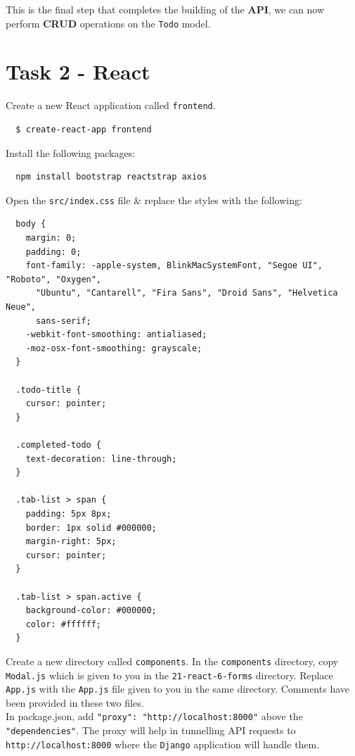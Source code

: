 \documentclass{article}
\begin{document}
This is the final step that completes the building of the \textbf{API}, we can now perform \textbf{CRUD} operations on the \texttt{Todo} model. 

\section*{Task 2 - React} 

Create a new React application called \texttt{frontend}.

\begin{verbatim}
  $ create-react-app frontend
\end{verbatim}

Install the following packages:

\begin{verbatim}
  npm install bootstrap reactstrap axios
\end{verbatim}

Open the \texttt{src/index.css} file \& replace the styles with the following:

\begin{verbatim}
  body {
    margin: 0;
    padding: 0;
    font-family: -apple-system, BlinkMacSystemFont, "Segoe UI", "Roboto", "Oxygen",
      "Ubuntu", "Cantarell", "Fira Sans", "Droid Sans", "Helvetica Neue",
      sans-serif;
    -webkit-font-smoothing: antialiased;
    -moz-osx-font-smoothing: grayscale;
  }

  .todo-title {
    cursor: pointer;
  }

  .completed-todo {
    text-decoration: line-through;
  }

  .tab-list > span {
    padding: 5px 8px;
    border: 1px solid #000000;
    margin-right: 5px;
    cursor: pointer;
  }

  .tab-list > span.active {
    background-color: #000000;
    color: #ffffff;
  }
\end{verbatim}

Create a new directory called \texttt{components}. In the \texttt{components} directory, copy \texttt{Modal.js} which is given to you in the \texttt{21-react-6-forms} directory. Replace \texttt{App.js} with the \texttt{App.js} file given to you in the same directory. Comments have been provided in these two files. \\

In package.json, add \texttt{"proxy": "http://localhost:8000"} above the \texttt{"dependencies"}. The proxy will help in tunnelling API requests to \texttt{http://localhost:8000} where the \texttt{Django} application will handle them. \\
\end{document}
